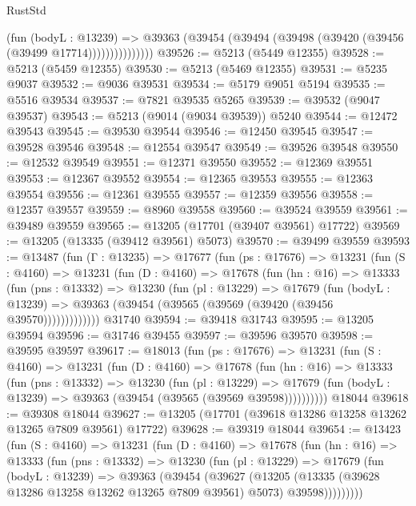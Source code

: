 \begin{lexlean}{RustStd}
\begin{coremodule}
                    (fun (bodyL : @13239) =>
                    @39363 (@39454 (@39494 (@39498 (@39420 (@39456 (@39499 @17714)))))))))))))))
@39526 := @5213 (@5449 @12355)
@39528 := @5213 (@5459 @12355)
@39530 := @5213 (@5469 @12355)
@39531 := @5235 @9037
@39532 := @9036 @39531
@39534 := @5179 @9051 @5194
@39535 := @5516 @39534
@39537 := @7821 @39535 @5265
@39539 := @39532 (@9047 @39537)
@39543 := @5213 (@9014 (@9034 @39539)) @5240
@39544 := @12472 @39543
@39545 := @39530 @39544
@39546 := @12450 @39545
@39547 := @39528 @39546
@39548 := @12554 @39547
@39549 := @39526 @39548
@39550 := @12532 @39549
@39551 := @12371 @39550
@39552 := @12369 @39551
@39553 := @12367 @39552
@39554 := @12365 @39553
@39555 := @12363 @39554
@39556 := @12361 @39555
@39557 := @12359 @39556
@39558 := @12357 @39557
@39559 := @8960 @39558
@39560 := @39524 @39559
@39561 := @39489 @39559
@39565 := @13205 (@17701 (@39407 @39561) @17722)
@39569 := @13205 (@13335 (@39412 @39561) @5073)
@39570 := @39499 @39559
@39593 := @13487
    (fun (Γ : @13235) =>
    @17677
      (fun (ps : @17676) =>
      @13231
        (fun (S : @4160) =>
        @13231
          (fun (D : @4160) =>
          @17678
            (fun (hn : @16) =>
            @13333
              (fun (pns : @13332) =>
              @13230
                (fun (pl : @13229) =>
                @17679
                  (fun (bodyL : @13239) =>
                  @39363 (@39454 (@39565 (@39569 (@39420 (@39456 @39570)))))))))))))
    @31740
@39594 := @39418 @31743
@39595 := @13205 @39594
@39596 := @31746 @39455
@39597 := @39596 @39570
@39598 := @39595 @39597
@39617 := @18013
    (fun (ps : @17676) =>
    @13231
      (fun (S : @4160) =>
      @13231
        (fun (D : @4160) =>
        @17678
          (fun (hn : @16) =>
          @13333
            (fun (pns : @13332) =>
            @13230
              (fun (pl : @13229) =>
              @17679 (fun (bodyL : @13239) => @39363 (@39454 (@39565 (@39569 @39598))))))))))
    @18044
@39618 := @39308 @18044
@39627 := @13205 (@17701 (@39618 @13286 @13258 @13262 @13265 @7809 @39561) @17722)
@39628 := @39319 @18044
@39654 := @13423
    (fun (S : @4160) =>
    @13231
      (fun (D : @4160) =>
      @17678
        (fun (hn : @16) =>
        @13333
          (fun (pns : @13332) =>
          @13230
            (fun (pl : @13229) =>
            @17679
              (fun (bodyL : @13239) =>
              @39363
                (@39454
                  (@39627
                    (@13205
                      (@13335 (@39628 @13286 @13258 @13262 @13265 @7809 @39561) @5073)
                      @39598)))))))))

\end{coremodule}
\end{lexlean}
